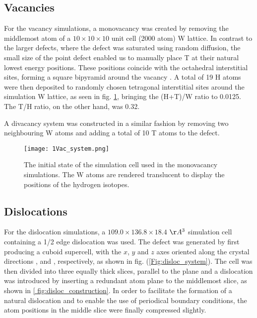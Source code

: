 \subsection{Vacancies}
For the vacancy simulations, a monovacancy was created by removing the middlemost atom of a $10\times 10 \times 10$ unit cell (2000 atom) W lattice.  
In contrast to the larger defects, where the defect was saturated using random diffusion, the small size of the point defect enabled us to manually place T at their natural lowest energy positions.
These positions coincide with the octahedral interstitial sites, forming a square bipyramid around the vacancy \cite{heinolaTungstenDFT}.
A total of 19 H atoms were then deposited to randomly chosen tetragonal interstitial sites around the simulation W lattice, as seen in fig. \ref{Fig:monovac_system}, bringing the (H+T)/W ratio to 0.0125. 
The T/H ratio, on the other hand, was 0.32.

A divacancy system was constructed in a similar fashion by removing two neighbouring W atoms and adding a total of 10 T atoms to the defect.

\begin{figure}[!ht]
\center
\texttt{[image: 1Vac\_system.png]}
\caption{The initial state of the simulation cell used in the monovacancy simulations. 
The W atoms are rendered translucent to display the positions of the hydrogen isotopes.}
\label{Fig:monovac_system}
\end{figure}

\subsection{Dislocations}
For the dislocation simulations, a  $109.0 \times 136.8 \times 18.4$ $\AA^3$ simulation cell containing a 1/2\hkl[1 1 1] edge dislocation was used. 
The defect was generated by first producing a cuboid supercell, with the $x$, $y$ and $z$ axes oriented along the crystal directions \hkl[1 1 1], \hkl[1 1 -2] and \hkl[-1 1 0], respectively, as shown in fig. (\ref{Fig:disloc_system}). 
The cell was then divided into three equally thick slices, parallel to the  plane and a dislocation was introduced by inserting a redundant  atom plane to the middlemost slice, as shown in \ref{ fig:disloc_construction}. 
In order to facilitate the formation of a natural dislocation and to enable the use of periodical boundary conditions, the atom positions in the middle slice were finally compressed slightly.

